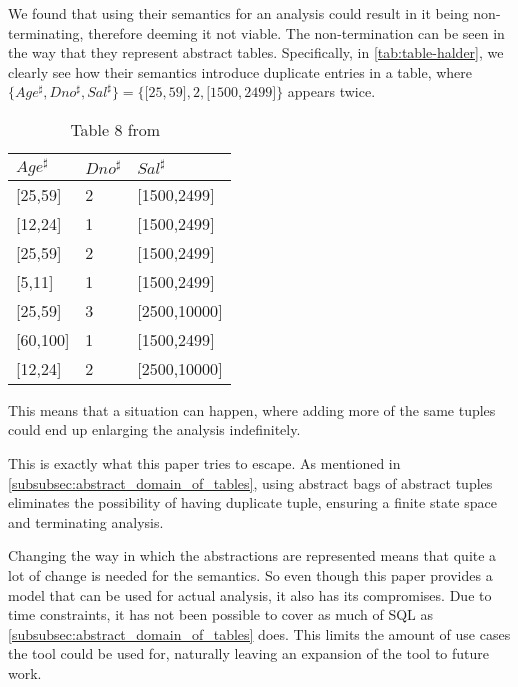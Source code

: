 We found that using their semantics for an analysis could result in it being non-terminating,
therefore deeming it not viable.
The non-termination can be seen in the way that they represent abstract tables.
Specifically, in \autoref{tab:table-halder},
we clearly see how their semantics introduce duplicate entries in a table, where $\{Age^\sharp,Dno^\sharp,Sal^\sharp\}=\{{[}25,59{]},2,{[}1500,2499{]}\}$ appears twice.
\begin{table}[]
    \centering
    \caption{Table 8 from~\cite{halder_abstract_2012}}
    \begin{tabular}{lll}
        \toprule
        $Age^\sharp$ & $Dno^\sharp$ & $Sal^\sharp$ \\ \midrule
        {[}25,59{]}             & 2                       & {[}1500,2499{]}         \\
        {[}12,24{]}             & 1                       & {[}1500,2499{]}         \\
        {[}25,59{]}             & 2                       & {[}1500,2499{]}         \\
        {[}5,11{]}              & 1                       & {[}1500,2499{]}         \\
        {[}25,59{]}             & 3                       & {[}2500,10000{]}        \\
        {[}60,100{]}            & 1                       & {[}1500,2499{]}         \\
        {[}12,24{]}             & 2                       & {[}2500,10000{]}        \\ \bottomrule
    \end{tabular}\label{tab:table-halder}
\end{table}
This means that a situation can happen, where adding more of the same tuples could end up enlarging the analysis indefinitely.

This is exactly what this paper tries to escape.
As mentioned in \autoref{subsubsec:abstract_domain_of_tables}, using abstract bags of abstract tuples eliminates the possibility of having duplicate tuple, ensuring a finite state space and terminating analysis.

Changing the way in which the abstractions are represented means that quite a lot of change is needed for the semantics.
So even though this paper provides a model that can be used for actual analysis, it also has its compromises.
Due to time constraints, it has not been possible to cover as much of SQL as \autoref{subsubsec:abstract_domain_of_tables} does.
This limits the amount of use cases the tool could be used for, naturally leaving an expansion of the tool to future work.

